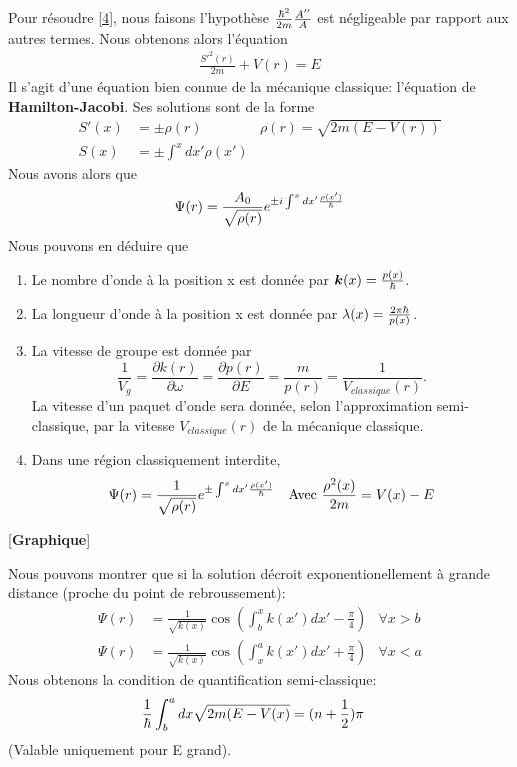 \documentclass[../notesdecours]{subfiles}
\begin{document}
Pour résoudre \eqref{4}, nous faisons l'hypothèse $\frac{\hbar^2}{2m}\frac{A''}{A}$ est négligeable par rapport aux autres termes. Nous obtenons alors l'équation 
\begin{align*}
\frac{S'^2 (r)}{2m} + V(r) = E
\end{align*}
Il s'agit d'une équation bien connue de la mécanique classique: l'équation de \textbf{Hamilton-Jacobi}. Ses solutions sont de la forme
\begin{subequations}
\begin{align}
S'(x) &= \pm \rho (r)		&\rho (r) = \sqrt{2m(E-V(r))}\\
S(x) &= \pm \int^x dx' \rho (x')
\end{align}
\end{subequations}
Nous avons alors que
\begin{equation}
\Psi (r) = \frac{A_0}{\sqrt{\rho (r)}}e^{\pm i \int^x dx' \frac{\rho (x')}{\hbar}}
\end{equation}
Nous pouvons en déduire que
\begin{enumerate}
\item Le nombre d'onde à la position x est donnée par $\bm{k}(x) = \frac{p(x)}{\hbar}$.
\item La longueur d'onde à la position x est donnée par $\lambda (x) = \frac{2\pi\hbar}{p(x)}$.
\item La vitesse de groupe est donnée par
\begin{equation}
\frac{1}{V_g} = \frac{\partial k(r)}{\partial \omega} = \frac{\partial p(r)}{\partial E} = \frac{m}{p(r)} = \frac{1}{V_{classique} (r)}.
\end{equation}
La vitesse d'un paquet d'onde sera donnée, selon l'approximation semi-classique, par la vitesse $V_{classique} (r)$ de la mécanique classique.
\item Dans une région classiquement interdite,
\begin{align}
&\Psi (r) = \frac{1}{\sqrt{\rho (r)}} e^{\pm \int^x dx' \frac{\rho(x')}{\hbar}}	&\text{Avec } \frac{\rho^2 (x)}{2m} = V(x)-E
\end{align}
\end{enumerate}

[\textbf{Graphique}]

Nous pouvons montrer que si la solution décroit exponentionellement à grande distance (proche du point de rebroussement):
\begin{align}
\Psi(r) &= \frac{1}{\sqrt{k(x)}} \cos (\int_b^x k(x') dx' - \frac{\pi}{4})	&\forall x > b\\
\Psi(r) &= \frac{1}{\sqrt{k(x)}} \cos (\int_x^a k(x')dx'+\frac{\pi}{4})		&\forall x < a
\end{align}
Nous obtenons la condition de quantification semi-classique:
\begin{align}
\frac{1}{\hbar} \int^a_b dx\sqrt{2m(E-V(x)} &= (n+\frac{1}{2})\pi
\end{align}
(Valable uniquement pour E grand).
\end{document}
